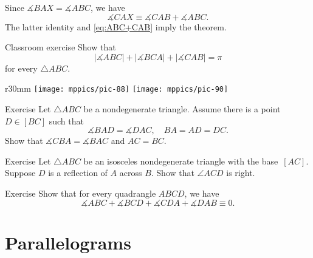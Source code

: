 Since $\measuredangle BAX=\measuredangle ABC$,
we have 
\[\measuredangle CAX\equiv\measuredangle CAB+\measuredangle ABC.\]
The latter identity and \ref{eq:ABC+CAB} imply the theorem.\qeds

\begin{thm}{Classroom exercise}\label{ex:|3sum|}
Show that 
$$|\measuredangle A B C|+ |\measuredangle B C A| + |\measuredangle C A B| = \pi$$
for every $\triangle ABC$.
\end{thm} 

{

\begin{wrapfigure}{r}{30mm}
\vskip-0mm
\centering
\texttt{[image: mppics/pic-88]}
\vskip4mm
\texttt{[image: mppics/pic-90]}
\end{wrapfigure}

\begin{thm}{Exercise}\label{ex:pent}
Let $\triangle ABC$ be a nondegenerate triangle.
Assume there is a point $D\in [BC]$ 
such that 
\[\measuredangle BAD=\measuredangle DAC,
\quad
BA=AD=DC.\]
Show that $\measuredangle CBA= \measuredangle BAC$ and $AC=BC$.
\end{thm}


\begin{thm}{Exercise}\label{ex:right-isos}
Let $\triangle ABC$ be an isosceles nondegenerate triangle with the base~$[AC]$.
Suppose $D$ is a reflection of $A$ across $B$.
Show that $\angle ACD$ is right.
\end{thm}




}

\begin{thm}{Exercise}\label{ex:quadrangle}
Show that for every quadrangle $ABCD$, we have
$$\measuredangle ABC+\measuredangle BCD+\measuredangle CDA+\measuredangle DAB\equiv 0.$$

\end{thm}


\section{Parallelograms}

